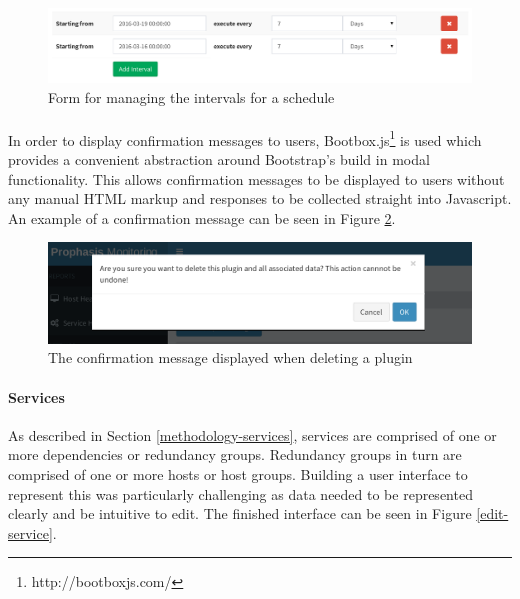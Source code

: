\documentclass[bsc,logo,twoside]{infthesis}
\begin{document}
\begin{figure}[H]
	\caption{Form for managing the intervals for a schedule}
	\label{schedule-intervals}
	\includegraphics[scale=0.54]{assets/screenshots/schedule-intervals.pdf}
\end{figure}

\paragraph*{}
	In order to display confirmation messages to users,
	Bootbox.js\footnote{http://bootboxjs.com/} is used which provides a convenient
	abstraction around Bootstrap's build in modal functionality.  This allows
	confirmation messages to be displayed to users without any manual HTML markup
	and responses to be collected straight into Javascript.  An example of a
	confirmation message can be seen in Figure \ref{bootbox-delete}.

\begin{figure}[H]
	\centering
	\caption{The confirmation message displayed when deleting a plugin}
	\label{bootbox-delete}
	\includegraphics[scale=0.6]{assets/screenshots/bootbox-delete.pdf}
\end{figure}

\paragraph*{Services}
	As described in Section \ref{methodology-services}, services are comprised of
	one or more dependencies or redundancy groups.  Redundancy groups in turn are
	comprised of one or more hosts or host groups.  Building a user interface to
	represent this was particularly challenging as data needed to be represented
	clearly and be intuitive to edit.  The finished interface can be seen in
	Figure \ref{edit-service}.
	
\end{document}
